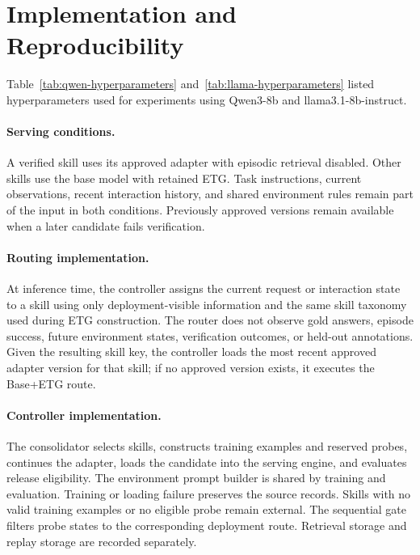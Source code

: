 \section{Implementation and Reproducibility}
\label{app:repro}

Table~\ref{tab:qwen-hyperparameters} and~\ref{tab:llama-hyperparameters} listed hyperparameters used for experiments using Qwen3-8b and llama3.1-8b-instruct.




\paragraph{Serving conditions.}
A verified skill uses its approved adapter with episodic retrieval disabled. Other skills use the base model with retained ETG. Task instructions, current observations, recent interaction history, and shared environment rules remain part of the input in both conditions. Previously approved versions remain available when a later candidate fails verification.

\paragraph{Routing implementation.}
At inference time, the controller assigns the current request or interaction state to a skill using only deployment-visible information and the same skill taxonomy used during ETG construction. The router does not observe gold answers, episode success, future environment states, verification outcomes, or held-out annotations. Given the resulting skill key, the controller loads the most recent approved adapter version for that skill; if no approved version exists, it executes the Base+ETG route.

\paragraph{Controller implementation.}
The consolidator selects skills, constructs training examples and reserved probes, continues the adapter, loads the candidate into the serving engine, and evaluates release eligibility. The environment prompt builder is shared by training and evaluation. Training or loading failure preserves the source records. Skills with no valid training examples or no eligible probe remain external. The sequential gate filters probe states to the corresponding deployment route. Retrieval storage and replay storage are recorded separately.

